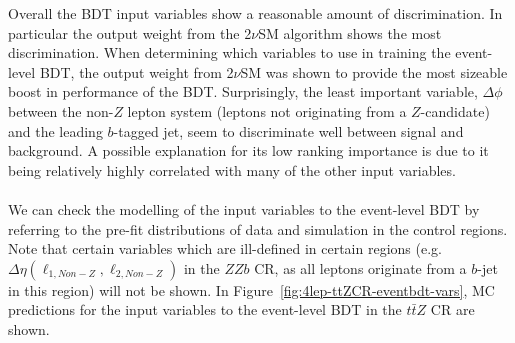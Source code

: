 Overall the BDT input variables show a reasonable amount of discrimination. In particular the output weight from the 2$\nu$SM algorithm shows the most discrimination. When determining which variables to use in training the event-level BDT, the output weight from 2$\nu$SM was shown to provide the most sizeable boost in performance of the BDT. Surprisingly, the least important variable, $\Delta \phi$ between the non-$Z$ lepton system (leptons not originating from a $Z$-candidate) and the leading $b$-tagged jet, seem to discriminate well between signal and background. A possible explanation for its low ranking importance is due to it being relatively highly correlated with many of the other input variables.\\\\
We can check the modelling of the input variables to the event-level BDT by referring to the pre-fit distributions of data and simulation in the control regions. Note that certain variables which are ill-defined in certain regions (e.g. $\Delta \eta (\ell_{1,Non-Z}, \ell_{2,Non-Z})$ in the $ZZb$ CR, as all leptons originate from a $b$-jet in this region) will not be shown.
In Figure~\ref{fig:4lep-ttZCR-eventbdt-vars}, MC predictions for the input variables to the event-level BDT in the $t\bar{t}Z$ CR are shown.
